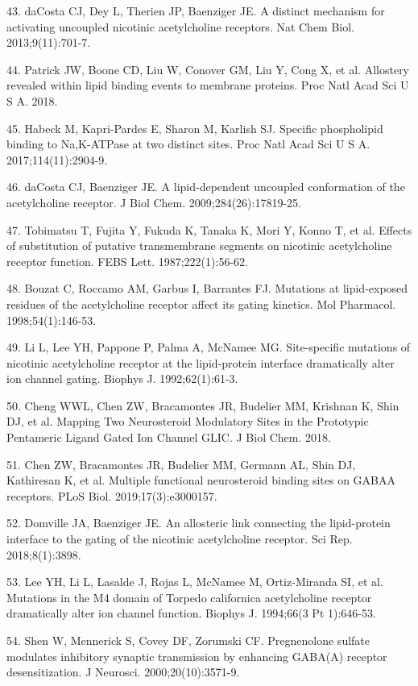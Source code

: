 43. daCosta CJ, Dey L, Therien JP, Baenziger JE. A distinct mechanism
for activating uncoupled nicotinic acetylcholine receptors. Nat Chem
Biol. 2013;9(11):701-7.

44. Patrick JW, Boone CD, Liu W, Conover GM, Liu Y, Cong X, et al.
Allostery revealed within lipid binding events to membrane proteins.
Proc Natl Acad Sci U S A. 2018.

45. Habeck M, Kapri-Pardes E, Sharon M, Karlish SJ. Specific
phospholipid binding to Na,K-ATPase at two distinct sites. Proc Natl
Acad Sci U S A. 2017;114(11):2904-9.

46. daCosta CJ, Baenziger JE. A lipid-dependent uncoupled conformation
of the acetylcholine receptor. J Biol Chem. 2009;284(26):17819-25.

47. Tobimatsu T, Fujita Y, Fukuda K, Tanaka K, Mori Y, Konno T, et al.
Effects of substitution of putative transmembrane segments on nicotinic
acetylcholine receptor function. FEBS Lett. 1987;222(1):56-62.

48. Bouzat C, Roccamo AM, Garbus I, Barrantes FJ. Mutations at
lipid-exposed residues of the acetylcholine receptor affect its gating
kinetics. Mol Pharmacol. 1998;54(1):146-53.

49. Li L, Lee YH, Pappone P, Palma A, McNamee MG. Site-specific
mutations of nicotinic acetylcholine receptor at the lipid-protein
interface dramatically alter ion channel gating. Biophys J.
1992;62(1):61-3.

50. Cheng WWL, Chen ZW, Bracamontes JR, Budelier MM, Krishnan K, Shin
DJ, et al. Mapping Two Neurosteroid Modulatory Sites in the Prototypic
Pentameric Ligand Gated Ion Channel GLIC. J Biol Chem. 2018.

51. Chen ZW, Bracamontes JR, Budelier MM, Germann AL, Shin DJ,
Kathiresan K, et al. Multiple functional neurosteroid binding sites on
GABAA receptors. PLoS Biol. 2019;17(3):e3000157.

52. Domville JA, Baenziger JE. An allosteric link connecting the
lipid-protein interface to the gating of the nicotinic acetylcholine
receptor. Sci Rep. 2018;8(1):3898.

53. Lee YH, Li L, Lasalde J, Rojas L, McNamee M, Ortiz-Miranda SI, et
al. Mutations in the M4 domain of Torpedo californica acetylcholine
receptor dramatically alter ion channel function. Biophys J. 1994;66(3
Pt 1):646-53.

54. Shen W, Mennerick S, Covey DF, Zorumski CF. Pregnenolone sulfate
modulates inhibitory synaptic transmission by enhancing GABA(A) receptor
desensitization. J Neurosci. 2000;20(10):3571-9.

